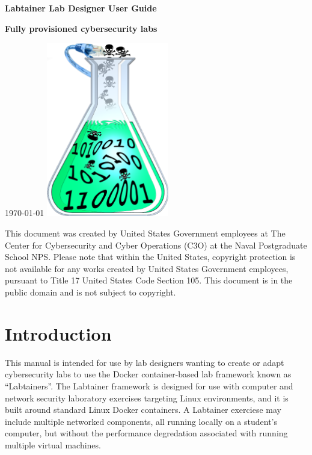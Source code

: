 \documentclass[12pt]{article}
\begin{document}
\begin{titlepage}
\centering
\vfill
\vspace*{4\baselineskip}
{\bfseries\Large
Labtainer Lab Designer User Guide\par
}
\vspace*{4\baselineskip}
{\bfseries
Fully provisioned cybersecurity labs\par
}
\vspace*{2\baselineskip}
\today
\vfill
\includegraphics[width=0.4\textwidth]{labtainer5-sm.png}
\vfill

\vspace{2.0in}
This document was created by United States Government employees at 
The Center for Cybersecurity and Cyber Operations (C3O) at the Naval Postgraduate School NPS. 
Please note that within the United States, copyright protection is not available for any works created  
by United States Government employees, pursuant to Title 17 United States Code Section 105.   
This document is in the public domain and is not subject to copyright. 
\end{titlepage}
\tableofcontents
\newpage
\section {Introduction}
This manual is intended for use by lab designers wanting
to create or adapt cybersecurity labs to use the Docker
container-based lab framework known as ``Labtainers''.
The Labtainer framework is designed for use with computer and network security
laboratory exercises targeting Linux environments, and it is built around 
standard Linux Docker containers.  A Labtainer exerciese may include multiple 
networked components, all running locally on a student's computer, but without
the performance degredation associated with running multiple virtual machines.
\end{document}
